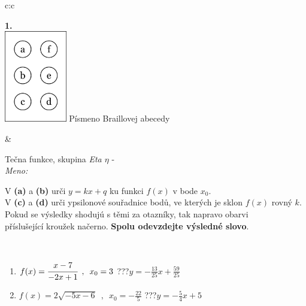\documentclass[10pt]{report}
\begin{document}
\begin{tabular}{c:c}
\begin{minipage}[c][104.5mm][t]{0.5\linewidth}
\begin{center}
\begin{minipage}{0.20\linewidth}
\begin{center}
{\Huge\bfseries 1.} \\[2mm]
\includegraphics[height=40mm]{../images/braille.png}
{\small Písmeno Braillovej abecedy}
\end{center}
\end{minipage}
\end{center}
\end{minipage}
&
\begin{minipage}[c][104.5mm][t]{0.5\linewidth}
\begin{center}
\vspace{7mm}
{\huge Tečna funkce, skupina \textit{Eta $\eta$} -}\\[5mm]
\textit{Meno:}\phantom{xxxxxxxxxxxxxxxxxxxxxxxxxxxxxxxxxxxxxxxxxxxxxxxxxxxxxxxxxxxxxxxxx}\\[5mm]
\begin{minipage}{0.95\linewidth}
\begin{center}
V \textbf{(a)} a \textbf{(b)} urči  $y = kx + q$ ku funkci $f(x)$ v bode $x_0$.\\V \textbf{(c)} a \textbf{(d)} urči ypsilonové souřadnice bodů, ve kterých je sklon $f(x)$ rovný $k$.\\Pokud se výsledky shodujú s těmi za otazníky, tak napravo obarvi\\příslušející kroužek načerno. \textbf{Spolu odevzdejte výsledné slovo}.
\end{center}
\end{minipage}
\\[1mm]
\begin{minipage}{0.79\linewidth}
\begin{center}
\begin{varwidth}{\linewidth}
\begin{enumerate}
\small
\item $f(x)=\cfrac{x-7}{-2x+1}\enspace , \enspace x_0=3$\quad \dotfill\; ???\;\dotfill \quad $y = -\frac{13}{25}x+\frac{59}{25}$
\item $f(x)=2\sqrt{-5x-6}\enspace , \enspace x_0=-\frac{22}{5}$\quad \dotfill\; ???\;\dotfill \quad $y = -\frac{5}{4}x+5$

\end{enumerate}
\end{varwidth}
\end{center}
\end{minipage}
\end{center}
\end{minipage}
\end{tabular}
\end{document}

